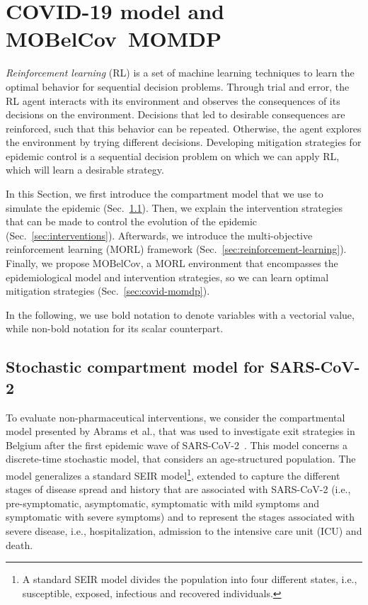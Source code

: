 \documentclass{article}
\renewcommand{\cite}[1]{\citep{#1}}
\newcommand{\momdpname}{MOBelCov}
\begin{document}
\section{COVID-19 model and \momdpname\  MOMDP}
\label{sec:sars-cov2-momdp}

\emph{Reinforcement learning} (RL) is a set of machine learning techniques to learn the optimal behavior for sequential decision problems. Through trial and error, the RL agent interacts with its environment and observes the consequences of its decisions on the environment. Decisions that led to desirable consequences are reinforced, such that this behavior can be repeated. Otherwise, the agent explores the environment by trying different decisions. Developing mitigation strategies for epidemic control is a sequential decision problem on which we can apply RL, which will learn a desirable strategy.

In this Section, we first introduce the compartment model that we use to simulate the epidemic (Sec.~\ref{sec:sars-cov2-momdp_model}). Then, we explain the intervention strategies that can be made to control the evolution of the epidemic (Sec.~\ref{sec:interventions}). Afterwards, we introduce the multi-objective reinforcement learning (MORL) framework (Sec.~\ref{sec:reinforcement-learning}). Finally, we propose \momdpname, a MORL environment that encompasses the epidemiological model and intervention strategies, so we can learn optimal mitigation strategies (Sec.~\ref{sec:covid-momdp}).

In the following, we use bold notation to denote variables with a vectorial value, while non-bold notation for its scalar counterpart.
\subsection{Stochastic compartment model for SARS-CoV-2}
\label{sec:sars-cov2-momdp_model}
To evaluate non-pharmaceutical interventions, we consider the compartmental model presented by Abrams et al., that was used to investigate exit strategies in Belgium after the first epidemic wave of SARS-CoV-2~\cite{abrams2021modelling}. This model concerns a discrete-time stochastic model, that considers an age-structured population. The model generalizes a standard SEIR model\footnote{A standard SEIR model divides the population into four different states, i.e., susceptible, exposed, infectious and recovered individuals.}, extended to capture the different stages of disease spread and history that are associated with SARS-CoV-2 (i.e., pre-symptomatic, asymptomatic, symptomatic with mild symptoms and symptomatic with severe symptoms) and to represent the stages associated with severe disease, i.e., hospitalization, admission to the intensive care unit (ICU) and death.
\end{document}
